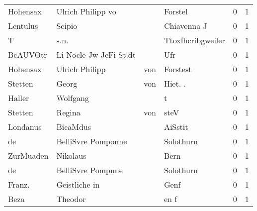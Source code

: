 \begin{tabular}{llllrr}
                 Hohensax &                  Ulrich Philipp vo &             &                                     Forstel &          0 &         1 \\
                 Lentulus &                             Scipio &             &                                 Chiavenna J &          0 &         1 \\
                        T &                               s.n. &             &                           Ttoxfhcribgweiler &          0 &         1 \\
                 BcAUVOtr &             Li Nocle Jw JeFi St.dt &             &                                         Ufr &          0 &         1 \\
                 Hohensax &                     Ulrich Philipp &         von &                                    Forstest &          0 &         1 \\
                  Stetten &                              Georg &         von &                                    Hiet. .  &          0 &         1 \\
                   Haller &                           Wolfgang &             &                                           t &          0 &         1 \\
                  Stetten &                             Regina &         von &                                        steV &          0 &         1 \\
                 Londanus &                           BicaMdus &             &                                     AiSstit &          0 &         1 \\
                       de &                 BelliSvre Pomponne &             &                                   Solothurn &          0 &         1 \\
                ZurMuaden &                           Nikolaus &             &                                        Bern &          0 &         1 \\
                       de &                  BelliSvre Pompnne &             &                                   Solothurn &          0 &         1 \\
                   Franz. &                      Geistliche in &             &                                        Genf &          0 &         1 \\
                     Beza &                            Theodor &             &                                        en f &          0 &         1 \\

\end{tabular}

